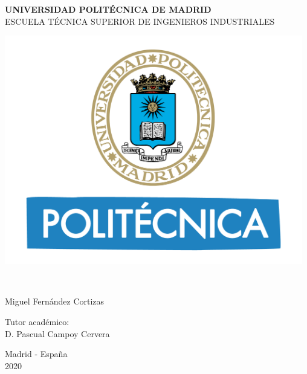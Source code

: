 
\begin{center}
	\textbf{ UNIVERSIDAD POLITÉCNICA DE MADRID }\\
	ESCUELA TÉCNICA SUPERIOR DE INGENIEROS INDUSTRIALES\\
	
	
	\vspace{1cm}
	
	\includegraphics[height = 10cm]{portada/logoupm}
	
	\vspace{1cm}
	
	{\LARGE {}}
	\\
	
	\vspace{0.2cm}
	{\LARGE	{}}
		 \vspace{0.2cm}
	
	\vspace{2cm}
	
	{\Large Miguel Fernández Cortizas}\\
	
	
	
	
	\vspace{2cm}
	
	{\large  Tutor académico:}\\
	\vspace{0.2cm}
	{\Large D. Pascual Campoy Cervera }
	
	\vspace{0.5cm}
	
	
	\vfill{\Large Madrid - Espa\~{n}a\\
		2020}

\end{center}
\newpage

